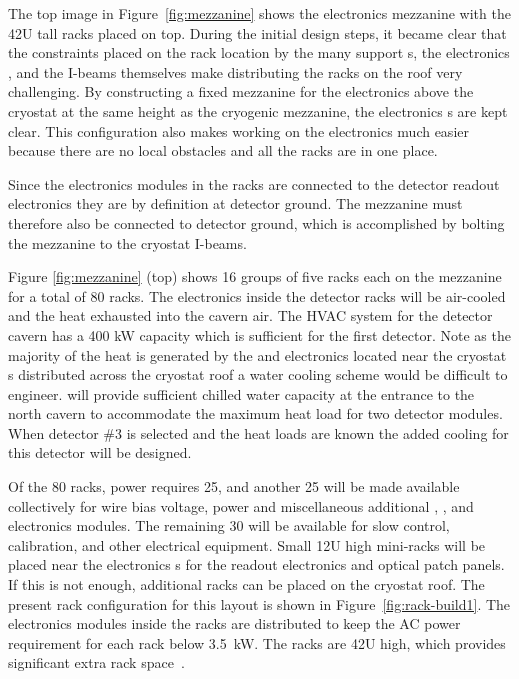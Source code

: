 The top image in Figure~\ref{fig:mezzanine} shows the  electronics mezzanine with the 42U tall racks placed on top. 
During the initial design steps, it became clear that the constraints placed on the rack location by the many  support \fdth{}s, the electronics \fdth, and the I-beams themselves make distributing the racks on the roof very challenging. 
By constructing a fixed mezzanine for the electronics above the cryostat at the same height as the cryogenic mezzanine, the electronics \fdth{}s are kept clear. 
This configuration also makes working on the electronics much easier because there are no local obstacles and all the racks are in one place.

Since the electronics modules in the  racks are connected to the detector readout electronics they are by definition at detector ground. The mezzanine must therefore also be connected to detector ground, which is accomplished by bolting the mezzanine to the cryostat I-beams. 
 
Figure \ref{fig:mezzanine} (top) shows 16 groups of five racks each
on the mezzanine for a total of 80 racks. 
The electronics inside the detector racks will be air-cooled and the heat exhausted into the cavern air. The HVAC system for the detector cavern has a 400 kW capacity which is sufficient for the first detector.  Note as the majority of the heat is generated by the  and  electronics located near the cryostat \fdth{}s distributed across the cryostat roof a water cooling scheme would be difficult to engineer.
  will provide sufficient chilled water capacity at the entrance to the north cavern to accommodate the maximum heat load for two detector modules. When detector \#3 is selected and the heat loads are known the added cooling for this detector will be designed.



Of the 80 racks,   power requires \num{25}, and another 25 will be made available collectively for   wire bias voltage,  power and miscellaneous additional , , and   electronics modules. 
The remaining 30 will be available for slow control, calibration, and other electrical equipment. 
Small 12U high mini-racks will  be placed near the electronics \fdth{}s for the  readout electronics and optical patch panels. If this is not enough, additional racks can be placed on the cryostat roof. The present rack configuration for this layout is shown in Figure~\ref{fig:rack-build1}. 
The electronics modules inside the racks are distributed to keep the AC power requirement for each rack below \SI{3.5}{kW}. 
The racks are 42U high, which provides significant extra rack space~\cite{bib:docdb4499}.  


